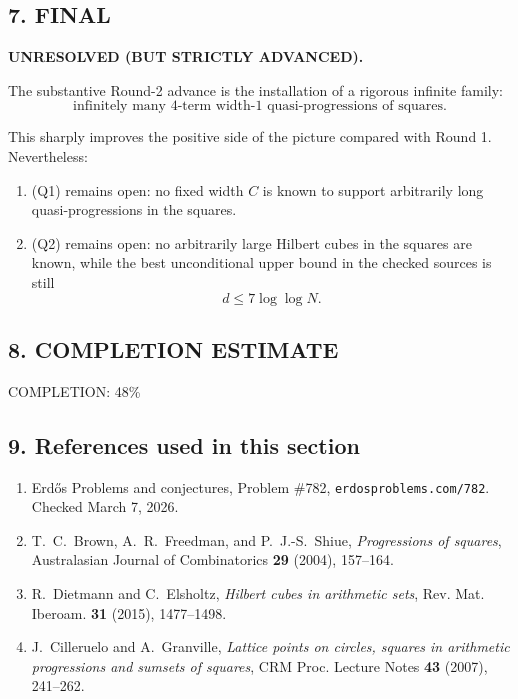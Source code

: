 \subsection*{7. FINAL}

\textbf{UNRESOLVED (BUT STRICTLY ADVANCED).}

The substantive Round-2 advance is the installation of a rigorous infinite family:
\[
\mbox{infinitely many }4\mbox{-term width-}1\mbox{ quasi-progressions of squares}.
\]

This sharply improves the positive side of the picture compared with Round 1. Nevertheless:

\begin{enumerate}
\item (Q1) remains open: no fixed width $C$ is known to support arbitrarily long quasi-progressions in the squares.
\item (Q2) remains open: no arbitrarily large Hilbert cubes in the squares are known, while the best unconditional upper bound in the checked sources is still
\[
d \leq 7\log\log N.
\]
\end{enumerate}

\subsection*{8. COMPLETION ESTIMATE}

COMPLETION: 48\%

\subsection*{9. References used in this section}

\begin{enumerate}
\item[\textbf{[EP782]}] Erd\H{o}s Problems and conjectures, Problem \#782, \texttt{erdosproblems.com/782}. Checked March 7, 2026.
\item[\textbf{[BFS04]}] T.~C.~Brown, A.~R.~Freedman, and P.~J.-S.~Shiue, \emph{Progressions of squares}, Australasian Journal of Combinatorics \textbf{29} (2004), 157--164.
\item[\textbf{[DiEl15]}] R.~Dietmann and C.~Elsholtz, \emph{Hilbert cubes in arithmetic sets}, Rev. Mat. Iberoam. \textbf{31} (2015), 1477--1498.
\item[\textbf{[CiGr07]}] J.~Cilleruelo and A.~Granville, \emph{Lattice points on circles, squares in arithmetic progressions and sumsets of squares}, CRM Proc. Lecture Notes \textbf{43} (2007), 241--262.
\end{enumerate}

